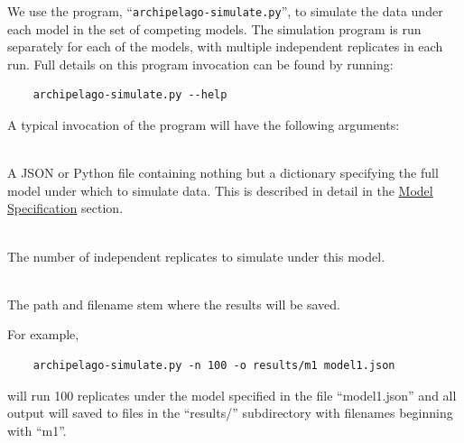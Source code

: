 \documentclass[11pt,openany]{memoir} %
\let\Item\item
\newcommand\SpecialItem{\renewcommand\item[1][]{\Item[\textbullet~\bfseries##1]}}
\begin{document}
We use the program, ``\texttt{archipelago-simulate.py}'', to simulate the data under each model in the set of competing models.
The simulation program is run separately for each of the models, with multiple independent replicates in each run.
Full details on this program invocation can be found by running:
\begin{lstlisting}
    archipelago-simulate.py --help
\end{lstlisting}
A typical invocation of the program will have the following arguments:
\begin{description}
    \SpecialItem
    \item[``MODEL-FILE''] \hfill \\
        A JSON or Python file containing nothing but a dictionary specifying the full model under which to simulate data. This is described in detail in the \hyperref[sec:model-specification]{Model Specification} section.
    \item[``\texttt{-n}'' or ``\texttt{--nreps}''] \hfill \\
        The number of independent replicates to simulate under this model.
    \item[``\texttt{-o}'' or ``\texttt{--output-prefix}''] \hfill \\
        The path and filename stem where the results will be saved.
\end{description}
For example,
\begin{lstlisting}
    archipelago-simulate.py -n 100 -o results/m1 model1.json
\end{lstlisting}
will run 100 replicates under the model specified in the file ``model1.json'' and all output will saved to files in the ``results/'' subdirectory with filenames beginning with ``m1''.
\end{document}
